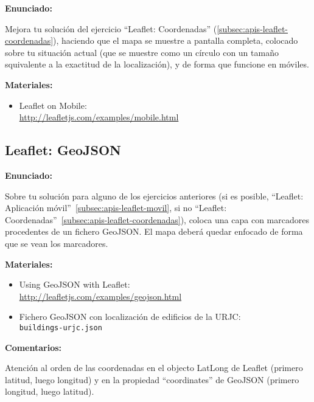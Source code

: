 \textbf{Enunciado:}

Mejora tu solución del ejercicio ``Leaflet: Coordenadas'' (\ref{subsec:apis-leaflet-coordenadas}), haciendo que el mapa se muestre a pantalla completa, colocado sobre tu situación actual (que se muestre como un círculo con un tamaño squivalente a la exactitud de la localización), y de forma que funcione en móviles.

\textbf{Materiales:}

\begin{itemize}
\item Leaflet on Mobile: \\
  \url{http://leafletjs.com/examples/mobile.html}
\end{itemize}

\subsection{Leaflet: GeoJSON}
\label{subsec:apis-leaflet-geojson}

\textbf{Enunciado:}

Sobre tu solución para alguno de los ejercicios anteriores (si es posible, ``Leaflet: Aplicación móvil''~\ref{subsec:apis-leaflet-movil}, si no ``Leaflet: Coordenadas''~\ref{subsec:apis-leaflet-coordenadas}), coloca una capa con marcadores procedentes de un fichero GeoJSON. El mapa deberá quedar enfocado de forma que se vean los marcadores.

\textbf{Materiales:}

\begin{itemize}
\item Using GeoJSON with Leaflet: \\
  \url{http://leafletjs.com/examples/geojson.html}
\item Fichero GeoJSON con localización de edificios de la URJC: \\
  \verb|buildings-urjc.json|
\end{itemize}

\textbf{Comentarios:}

Atención al orden de las coordenadas en el objecto LatLong de Leaflet (primero latitud, luego longitud) y en la propiedad ``coordinates'' de GeoJSON (primero longitud, luego latitud).

